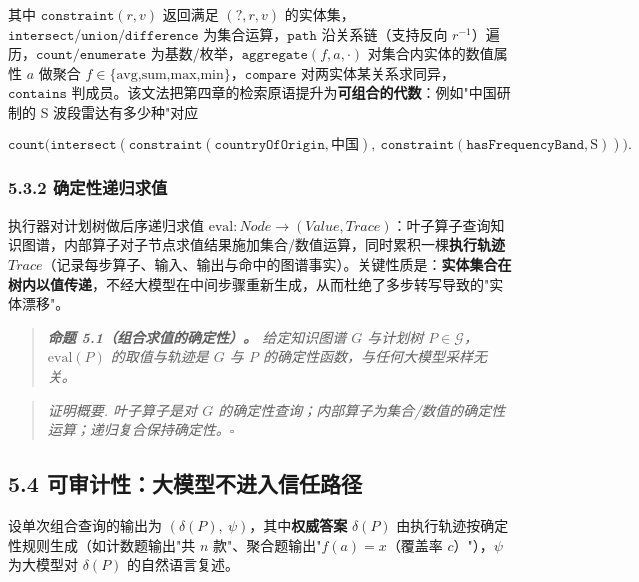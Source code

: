 \documentclass[12pt,a4paper]{ctexart}
\begin{document}
其中 $\mathtt{constraint}(r,v)$ 返回满足 $(?, r, v)$ 的实体集，$\mathtt{intersect}/\mathtt{union}/\mathtt{difference}$ 为集合运算，$\mathtt{path}$ 沿关系链（支持反向 $r^{-1}$）遍历，$\mathtt{count}/\mathtt{enumerate}$ 为基数/枚举，$\mathtt{aggregate}(f,a,\cdot)$ 对集合内实体的数值属性 $a$ 做聚合 $f\in\{\text{avg,sum,max,min}\}$，$\mathtt{compare}$ 对两实体某关系求同异，$\mathtt{contains}$ 判成员。该文法把第四章的检索原语提升为\textbf{可组合的代数}：例如"中国研制的 S 波段雷达有多少种"对应

\[\mathtt{count}\big(\mathtt{intersect}(\mathtt{constraint}(\texttt{countryOfOrigin},\text{中国}),\ \mathtt{constraint}(\texttt{hasFrequencyBand},\text{S}))\big).\]

\subsubsection*{5.3.2 确定性递归求值}

执行器对计划树做后序递归求值 $\mathrm{eval}:\textit{Node}\to (\textit{Value},\textit{Trace})$：叶子算子查询知识图谱，内部算子对子节点求值结果施加集合/数值运算，同时累积一棵\textbf{执行轨迹} $\textit{Trace}$（记录每步算子、输入、输出与命中的图谱事实）。关键性质是：\textbf{实体集合在树内以值传递}，不经大模型在中间步骤重新生成，从而杜绝了多步转写导致的"实体漂移"。

\begin{quote}\itshape \textbf{命题 5.1（组合求值的确定性）。} 给定知识图谱 $G$ 与计划树 $P\in\mathcal{G}$，$\mathrm{eval}(P)$ 的取值与轨迹是 $G$ 与 $P$ 的确定性函数，与任何大模型采样无关。\end{quote}
\begin{quote}\itshape \end{quote}
\begin{quote}\itshape \textit{证明概要.} 叶子算子是对 $G$ 的确定性查询；内部算子为集合/数值的确定性运算；递归复合保持确定性。$\square$\end{quote}

\subsection*{5.4 可审计性：大模型不进入信任路径}

设单次组合查询的输出为 $(\delta(P),\ \psi)$，其中\textbf{权威答案} $\delta(P)$ 由执行轨迹按确定性规则生成（如计数题输出"共 $n$ 款"、聚合题输出"$f(a)=x$（覆盖率 $c$）"），$\psi$ 为大模型对 $\delta(P)$ 的自然语言复述。
\end{document}
